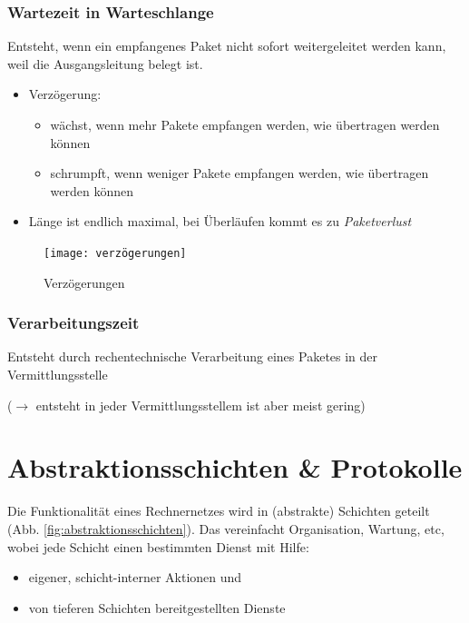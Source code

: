 \documentclass[12pt]{report}
\begin{document}
\subsubsection{Wartezeit in Warteschlange}
Entsteht, wenn ein empfangenes Paket nicht sofort weitergeleitet werden kann,
weil die Ausgangsleitung belegt ist.

\begin{itemize}
  \item Verzögerung:
        \begin{itemize}
          \item wächst, wenn mehr Pakete empfangen werden, wie übertragen werden können
          \item schrumpft, wenn weniger Pakete empfangen werden, wie übertragen werden können
        \end{itemize}
  \item Länge ist endlich maximal, bei Überläufen kommt es zu \textit{Paketverlust}
\end{itemize}


\begin{figure}[H]
  \caption{Verzögerungen}
  \label{fig:verzoegerungen}
  \begin{center}
    \texttt{[image: verzögerungen]}
  \end{center}
\end{figure}

\subsubsection{Verarbeitungszeit}
Entsteht durch rechentechnische Verarbeitung eines Paketes in der Vermittlungsstelle

($\rightarrow$ entsteht in jeder Vermittlungsstellem ist aber meist gering)


\section{Abstraktionsschichten \& Protokolle}
Die Funktionalität eines Rechnernetzes wird in (abstrakte) Schichten geteilt (Abb. \ref{fig:abstraktionsschichten}). 
Das vereinfacht Organisation, Wartung, etc, 
wobei jede Schicht einen bestimmten Dienst mit Hilfe:
\begin{itemize}
  \item eigener, schicht-interner Aktionen und
  \item von tieferen Schichten bereitgestellten Dienste
\end{itemize}
\end{document}
